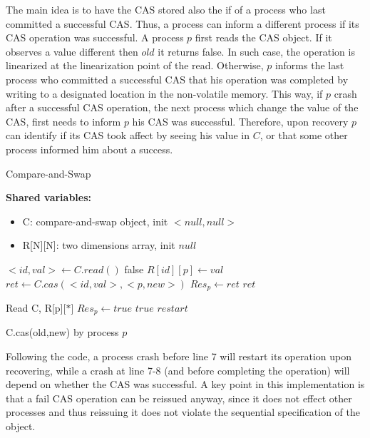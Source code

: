 The main idea is to have the CAS stored also the if of a process who last committed a successful CAS. Thus, a process can inform a different process if its CAS operation was successful.
A process $p$ first reads the CAS object. If it observes a value different then $old$ it returns false. In such case, the operation is linearized at the linearization point of the read. Otherwise, $p$ informs the last process who committed a successful CAS that his operation was completed by writing to a designated location in the non-volatile memory. This way, if $p$ crash after a successful CAS operation, the next process which change the value of the CAS, first needs to inform $p$ his CAS was successful. Therefore, upon recovery $p$ can identify if its CAS took affect by seeing his value in $C$, or that some other process informed him about a success.

\begin{algorithm}
	\caption{Compare-and-Swap}\label{recoverable CAS}
	
	\hspace*{\algorithmicindent} \textbf{Shared variables:}
	\begin{itemize}
		\item C: compare-and-swap object, init $<null,null>$
		\item R[N][N]: two dimensions array, init $null$
	\end{itemize}
 
	\begin{algorithmic}[1]
		\State $<id,val> \gets C.read()$
		\State \Return false
		\EndIf
  		\State $R[id][p] \gets val$
		\EndIf
		\State $ret \gets C.cas(<id,val>, <p,new>)$
		\State $Res_p \gets ret$
		\State \Return $ret$
		\EndProcedure
		
		\State Read C, R[p][$*$]
		\State $Res_p \gets true$
		\State \Return $true$
		\Else {}
		\State \Return $restart$
		\EndIf
		\EndProcedure
	\end{algorithmic}
	\caption{C.cas(old,new) by process $p$}
\end{algorithm}


Following the code, a process crash before line 7 will restart its operation upon recovering, while a crash at line 7-8 (and before completing the operation) will depend on whether the CAS was successful. A key point in this implementation is that a fail CAS operation can be reissued anyway, since it does not effect other processes and thus reissuing it does not violate the sequential specification of the object.

